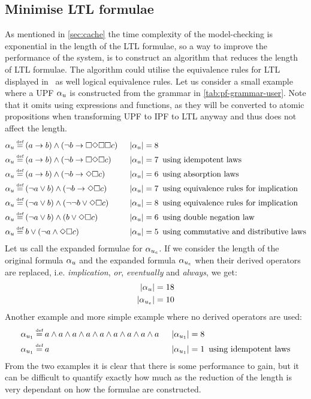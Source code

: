 \subsection{Minimise LTL formulae}
As mentioned in \autoref{sec:cache} the time complexity of the model-checking is exponential in the length of the LTL formulae, so a way to improve the performance of the system, is to construct an algorithm that reduces the length of LTL formulae. The algorithm could utilise the equivalence rules for LTL displayed in~\cite[Fig.~5.7]{baier2008principles} as well logical equivalence rules. Let us consider a small example where a UPF $\alpha_u$ is constructed from the grammar in \autoref{tab:pf-grammar-user}. Note that it omits using expressions and functions, as they will be converted to atomic propositions when transforming UPF to IPF to LTL anyway and thus does not affect the length.
\begin{align*}
    \pf_u &\eqdef (a \imply b) \land (\lnot b \imply \G\F\G\G c)     \enskip &|\upf| = 8 & \\
    \pf_u &\eqdef (a \imply b) \land (\lnot b \imply \G\F\G c)       \enskip &|\upf| = 7 &\enskip \text{using idempotent laws} \\
    \pf_u &\eqdef (a \imply b) \land (\lnot b \imply \F\G c)         \enskip &|\upf| = 6 &\enskip \text{using absorption laws} \\
    \pf_u &\eqdef (\lnot a \lor b) \land (\lnot b \imply \F\G c)     \enskip &|\upf| = 7 &\enskip \text{using equivalence rules for implication} \\
    \pf_u &\eqdef (\lnot a \lor b) \land (\lnot \lnot b \lor \F\G c) \enskip &|\upf| = 8 &\enskip \text{using equivalence rules for implication} \\
    \pf_u &\eqdef (\lnot a \lor b) \land (b \lor \F\G c)             \enskip &|\upf| = 6 &\enskip \text{using double negation law} \\
    \pf_u &\eqdef b \lor (\lnot a \land \F\G c)                      \enskip &|\upf| = 5 &\enskip \text{using commutative and distributive laws}
\end{align*}
Let us call the expanded formulae for $\alpha_{u_e}$. If we consider the length of the original formula $\alpha_u$ and the expanded formula $\alpha_{u_e}$ when their derived operators are replaced, i.e. \emph{implication}, \emph{or}, \emph{eventually} and \emph{always}, we get:
\begin{align}
    |\alpha_u| = 18 \\
    |\alpha_{u_e}| = 10
\end{align}
Another example and more simple example where no derived operators are used:
\begin{align*}
    \pf_{u_1} &\eqdef a \land a \land a \land a \land a \land a \land a \land a \land a \enskip &|\pf_{u_1}| = 8 & \\
    \pf_{u_1} &\eqdef a                                                                 \enskip &|\pf_{u_1}| = 1 &\enskip \text{using idempotent laws}
\end{align*}
From the two examples it is clear that there is some performance to gain, but it can be difficult to quantify exactly how much as the reduction of the length is very dependant on how the formulae are constructed.